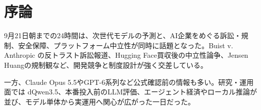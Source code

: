 \section*{序論}
9月21日朝までの24時間は、次世代モデルの予測と、AI企業をめぐる訴訟・規制、安全保障、プラットフォーム中立性が同時に話題となった。Buist v. Anthropic の反トラスト訴訟報道、Hugging Face買収後の中立性論争、Jensen Huangの規制観など、開発競争と制度設計が強く交差している。

一方、Claude Opus 5.5やGPT-6系列など公式確認前の情報も多い。研究・運用面では dQwen3.5、本番投入前のLLM評価、エージェント経済やローカル推論が並び、モデル単体から実運用へ関心が広がった一日だった。

